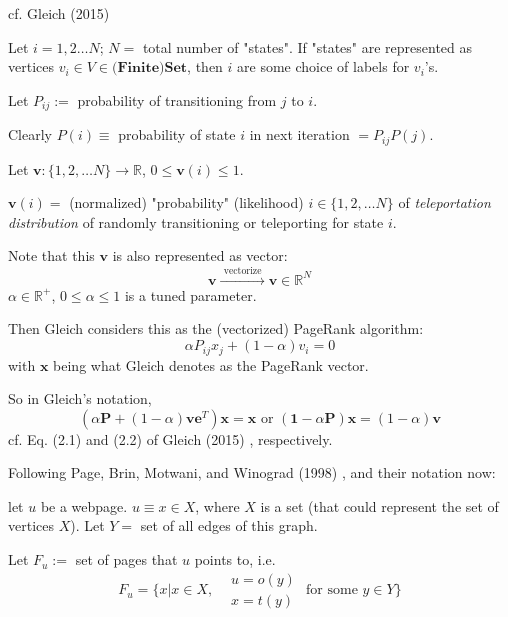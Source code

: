 \documentclass[10pt]{amsart}
\begin{document}
\begin{multicols*}{2}
cf. Gleich (2015) \cite{Glei2015}

Let $i=1,2\dots N$; $N=$ total number of "states".  If "states" are represented as vertices $v_i \in V \in \mathbf{\text{(Finite)Set}}$, then $i$ are some choice of labels for $v_i$'s.  

Let $P_{ij} :=$ probability of transitioning from $j$ to $i$.  

Clearly $P(i) \equiv $ probability of state $i$ in next iteration $=P_{ij}P(j)$.  

Let $\mathbf{v}:\lbrace 1,2, \dots N \rbrace \to \mathbb{R}$, $0\leq \mathbf{v}(i) \leq 1$.  

$\mathbf{v}(i) = $ (normalized) "probability" (likelihood) $i \in \lbrace 1,2, \dots N \rbrace$ of \emph{teleportation distribution} of randomly transitioning or teleporting for state $i$.  

Note that this $\mathbf{v}$ is also represented as vector:
\[
\mathbf{v} \xrightarrow{ \text{ vectorize } } \mathbf{v} \in \mathbb{R}^N
\]
$\alpha \in \mathbb{R}^+$, $0\leq \alpha \leq 1$ is a tuned parameter.  

Then Gleich considers this as the (vectorized) PageRank algorithm:
\begin{equation}
\alpha P_{ij}x_j + (1-\alpha) v_i =0 
\end{equation}
with $\mathbf{x}$ being what Gleich denotes as the PageRank vector.  

So in Gleich's notation, 
\begin{equation}
(\alpha \mathbf{P} + (1-\alpha)\mathbf{v} \mathbf{e}^T )\mathbf{x} = \mathbf{x}  \text{ or } ( \mathbf{1} - \alpha \mathbf{P}) \mathbf{x} = (1-\alpha) \mathbf{v}
\end{equation}
cf. Eq. (2.1) and (2.2) of Gleich (2015) \cite{Glei2015}, respectively.  

Following Page, Brin, Motwani, and Winograd (1998) \cite{PBMW1998}, and their notation now:

let $u$ be a webpage.  $u \equiv x \in X$, where $X$ is a set (that could represent the set of vertices $X$).  Let $Y = $ set of all edges of this graph.  

Let $F_u := $ set of pages that $u$ points to, i.e. 
\begin{equation}
F_u = \lbrace x | x\in X, \begin{aligned} & u = o(y) \\
& x = t(y) \end{aligned} \text{ for some } y \in Y \rbrace 
\end{equation}


\end{multicols*}
\end{document}
